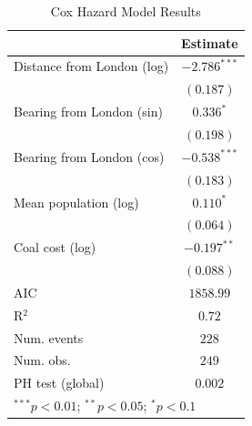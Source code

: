 
\begin{table}
\begin{center}
\begin{tabular}{l c}
\hline
 & Estimate \\
\hline
Distance from London (log) & $-2.786^{***}$ \\
 & $(0.187)$ \\
Bearing from London (sin) & $0.336^{*}$ \\
 & $(0.198)$ \\
Bearing from London (cos) & $-0.538^{***}$ \\
 & $(0.183)$ \\
Mean population (log) & $0.110^{*}$ \\
 & $(0.064)$ \\
Coal cost (log) & $-0.197^{**}$ \\
 & $(0.088)$ \\
\hline
AIC              & $1858.99$ \\
R$^2$            & $0.72$ \\
Num. events      & $228$ \\
Num. obs.        & $249$ \\
PH test (global) & $0.002$ \\
\hline
\multicolumn{2}{l}{\scriptsize{$^{***}p<0.01$; $^{**}p<0.05$; $^{*}p<0.1$}}
\end{tabular}
\caption{Cox Hazard Model Results}
\label{tab:cox}
\end{center}
\end{table}
